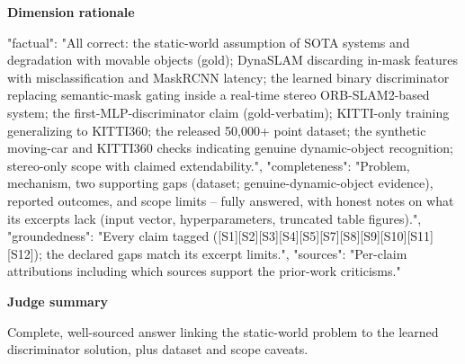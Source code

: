 \documentclass[10pt]{article}
\begin{document}
\textbf{Dimension rationale}
\begin{EvidenceText}
{
  "factual": "All correct: the static-world assumption of SOTA systems and degradation with movable objects (gold); DynaSLAM discarding in-mask features with misclassification and MaskRCNN latency; the learned binary discriminator replacing semantic-mask gating inside a real-time stereo ORB-SLAM2-based system; the first-MLP-discriminator claim (gold-verbatim); KITTI-only training generalizing to KITTI360; the released 50,000+ point dataset; the synthetic moving-car and KITTI360 checks indicating genuine dynamic-object recognition; stereo-only scope with claimed extendability.",
  "completeness": "Problem, mechanism, two supporting gaps (dataset; genuine-dynamic-object evidence), reported outcomes, and scope limits -- fully answered, with honest notes on what its excerpts lack (input vector, hyperparameters, truncated table figures).",
  "groundedness": "Every claim tagged ([S1][S2][S3][S4][S5][S7][S8][S9][S10][S11][S12]); the declared gaps match its excerpt limits.",
  "sources": "Per-claim attributions including which sources support the prior-work criticisms."
}
\end{EvidenceText}

\textbf{Judge summary}
\begin{EvidenceText}
Complete, well-sourced answer linking the static-world problem to the learned discriminator solution, plus dataset and scope caveats.
\end{EvidenceText}
\end{document}
